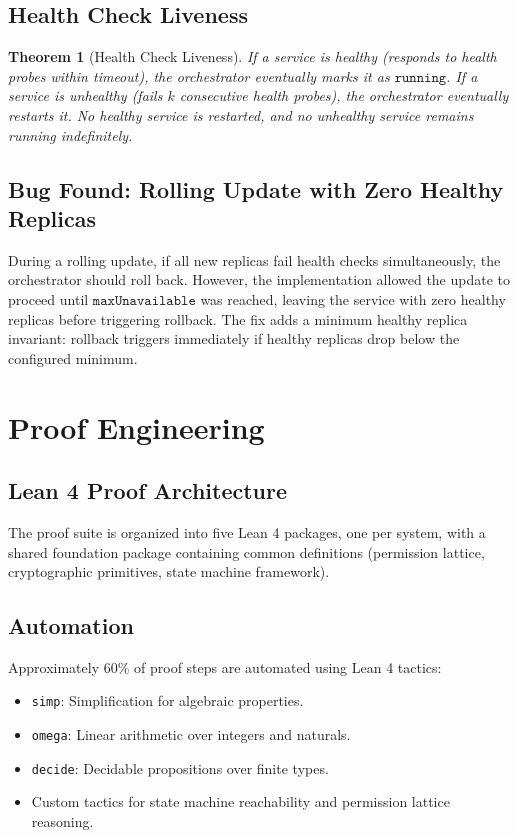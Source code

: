\documentclass[11pt]{article}
\newtheorem{theorem}{Theorem}
\begin{document}
\subsection{Health Check Liveness}

\begin{theorem}[Health Check Liveness]
If a service is healthy (responds to health probes within timeout), the
orchestrator eventually marks it as $\texttt{running}$. If a service is
unhealthy (fails $k$ consecutive health probes), the orchestrator eventually
restarts it. No healthy service is restarted, and no unhealthy service remains
running indefinitely.
\end{theorem}

\subsection{Bug Found: Rolling Update with Zero Healthy Replicas}

During a rolling update, if all new replicas fail health checks simultaneously,
the orchestrator should roll back. However, the implementation allowed the
update to proceed until $\texttt{maxUnavailable}$ was reached, leaving the
service with zero healthy replicas before triggering rollback. The fix adds
a minimum healthy replica invariant: rollback triggers immediately if healthy
replicas drop below the configured minimum.

\section{Proof Engineering}
\label{sec:engineering}

\subsection{Lean 4 Proof Architecture}

The proof suite is organized into five Lean 4 packages, one per system, with
a shared foundation package containing common definitions (permission lattice,
cryptographic primitives, state machine framework).

\subsection{Automation}

Approximately 60\% of proof steps are automated using Lean 4 tactics:
\begin{itemize}[leftmargin=1.1em]
    \item \texttt{simp}: Simplification for algebraic properties.
    \item \texttt{omega}: Linear arithmetic over integers and naturals.
    \item \texttt{decide}: Decidable propositions over finite types.
    \item Custom tactics for state machine reachability and permission
    lattice reasoning.
\end{itemize}
\end{document}
